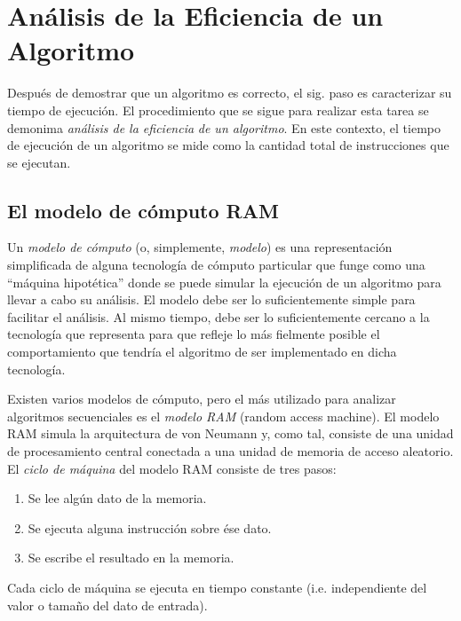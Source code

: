 
\chapter{Análisis de la Eficiencia de un Algoritmo}

Después de demostrar que un algoritmo es correcto, el sig. paso es
caracterizar su tiempo de ejecución. El procedimiento que se sigue
para realizar esta tarea se demonima \emph{análisis de la eficiencia}
\emph{de un algoritmo}. En este contexto, el tiempo de ejecución de
un algoritmo se mide como la cantidad total de instrucciones que se
ejecutan. 

\section{El modelo de cómputo RAM}

Un \emph{modelo de cómputo} (o, simplemente, \emph{modelo}) es una
representación simplificada de alguna tecnología de cómputo particular
que funge como una ``máquina hipotética'' donde se puede simular
la ejecución de un algoritmo para llevar a cabo su análisis. El modelo
debe ser lo suficientemente simple para facilitar el análisis. Al
mismo tiempo, debe ser lo suficientemente cercano a la tecnología
que representa para que refleje lo más fielmente posible el comportamiento
que tendría el algoritmo de ser implementado en dicha tecnología. 

Existen varios modelos de cómputo, pero el más utilizado para analizar
algoritmos secuenciales es el \emph{modelo RAM }(random access machine).
El modelo RAM simula la arquitectura de von Neumann y, como tal, consiste
de una unidad de procesamiento central conectada a una unidad de memoria
de acceso aleatorio. El \emph{ciclo de máquina} del modelo RAM consiste
de tres pasos: 
\begin{enumerate}
\item Se lee algún dato de la memoria. 
\item Se ejecuta alguna instrucción sobre ése dato.
\item Se escribe el resultado en la memoria. 
\end{enumerate}
Cada ciclo de máquina se ejecuta en tiempo constante (i.e. independiente
del valor o tamaño del dato de entrada). 


